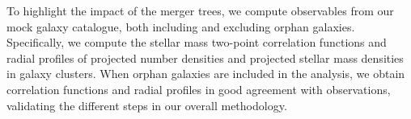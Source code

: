 To highlight  the impact of  the merger trees, we  compute observables
from our  mock galaxy catalogue,  both including and  excluding orphan
galaxies.  Specifically,   we  compute  the  stellar   mass  two-point
correlation  functions   and  radial  profiles  of   projected  number
densities and projected stellar mass densities in galaxy clusters. When orphan
galaxies are included in the analysis, we obtain correlation functions
and radial  profiles in  good agreement with  observations, validating
the different steps in our overall methodology.





%
%
%
